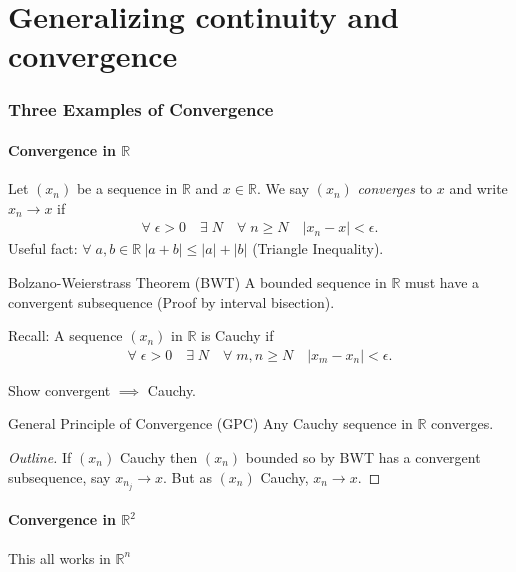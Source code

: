 \part{Generalizing continuity and convergence}

\section{Three Examples of Convergence} \label{sec:1}
\subsection{Convergence in $\mathbb{R}$}
Let $(x_n)$ be a sequence in $\mathbb{R}$ and $x \in \mathbb{R}$.
We say $(x_n)$ \textit{converges} to $x$ and write $x_n \to x$ if
\begin{align*}
    \forall \; \epsilon > 0 \quad \exists \; N \quad \forall \; n \geq N \quad |x_n - x| < \epsilon.
\end{align*} 
Useful fact: $\forall \; a, b \in \mathbb{R} \ |a+b| \leq |a| + |b|$ (Triangle Inequality).

Bolzano-Weierstrass Theorem (BWT)
A bounded sequence in $\mathbb{R}$ must have a convergent subsequence (Proof by interval bisection).

Recall: A sequence $(x_n)$ in $\mathbb{R}$ is Cauchy if 
\begin{align*}
    \forall \; \epsilon > 0 \quad \exists \; N \quad \forall \; m, n \geq N \quad |x_m - x_n| < \epsilon.
\end{align*} 

\begin{exercise}[Easy]
    Show convergent $\implies$ Cauchy.
\end{exercise} 

General Principle of Convergence (GPC)
Any Cauchy sequence in $\mathbb{R}$ converges.

\begin{proof}[Outline]
    If $(x_n)$ Cauchy then $(x_n)$ bounded so by BWT has a convergent subsequence, say $x_{n_j} \to x$.
    But as $(x_n)$ Cauchy, $x_n \to x$.
\end{proof} 

\subsection{Convergence in $\mathbb{R}^2$}
\begin{remark}
    This all works in $\mathbb{R}^n$
\end{remark} 

